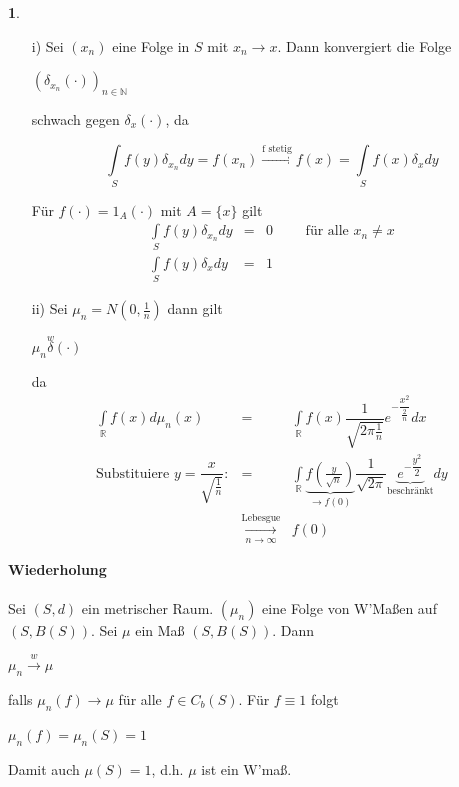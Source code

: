 \documentclass[10pt,a4paper]{report}
\newcommand{\N}{\mathbb{N}}
\newcommand{\R}{\mathbb{R}}
\numberwithin{equation}{section}
\numberwithin{figure}{section}
\theoremstyle{plain}
\theoremstyle{definition}
\theoremstyle{plain}
\theoremstyle{definition}
\newtheorem{example}{\protect\examplename}[section]
\theoremstyle{remark}
\theoremstyle{plain}
\theoremstyle{plain}
\theoremstyle{plain}
\theoremstyle{plain}
\theoremstyle{plain}
\providecommand{\examplename}{Beispiel}
\newcommand{\1}{ \mathbb{1} } %
\begin{document}
\begin{example}
  \begin{itemize}
  \item[i)] Sei $(x_n)$ eine Folge in $S$ mit $x_n \to x$. Dann
    konvergiert die Folge
    \begin{center}
      $(\delta_{x_n}(\cdot))_{n \in \N}$
    \end{center}
    schwach gegen $\delta_x(\cdot)$, da
    \begin{center}
      \[\int\limits_Sf(y)\delta_{x_n} dy=f(x_n) \overset{\text{f
          stetig}}{\to} f(x)=\int\limits_S f(x)\delta_x dy \]
    \end{center}
    Für $f(\cdot)=1_A(\cdot)$ mit $A=\{x\}$ gilt
    \begin{eqnarray*}
      \int\limits_S f(y)\delta_{x_n} dy &=& 0 \qquad \text{ für alle } x_n \neq x\\
      \int\limits_S f(y) \delta_x  dy &=& 1
    \end{eqnarray*}
  \item[ii)] Sei $\mu_n=N(0,\frac{1}{n})$ dann gilt
    \begin{center}
      $\mu_n \overset{w} \delta(\cdot)$
    \end{center}
    da
    \begin{eqnarray*}
      \int\limits_\R f(x) d\mu_n(x) &=& \int\limits_\R f(x)\dfrac{1}{\sqrt{2\pi \frac{1}{n}}}e^{-\dfrac{x^2}{\frac{2}{n}}} dx\\
      \text{Substituiere } y=\dfrac{x}{\sqrt{\frac{1}{n}}}: &=& \int\limits_\R \underbrace{f\left(\frac{y}{\sqrt{n}}\right)}_{\to f(0)} \dfrac{1}{\sqrt{2\pi}}\underbrace{e^{-\dfrac{y^2}{2}}}_{\text{beschränkt}} dy\\
      &\underset{n \to \infty}{\overset{\text{Lebesgue}}{\to}} &f(0)
    \end{eqnarray*}
  \end{itemize}
\end{example}
\textbf{Wiederholung}\\\\
Sei $(S,d)$ ein metrischer Raum. $(\mu_n)$ eine Folge von W'Maßen auf $(S,B(S))$. Sei $\mu$ ein Maß $(S,B(S))$. Dann
\begin{center}
$\mu_n \overset{w}{\to} \mu$
\end{center}
falls $\mu_n(f) \to \mu$ für alle $f \in C_b(S)$. Für $f \equiv 1$ folgt
\begin{center}
$\mu_n(f)=\mu_n(S)=1$
\end{center}
Damit auch $\mu(S)=1$, d.h. $\mu$ ist ein W'maß.\\\\
\end{document}

